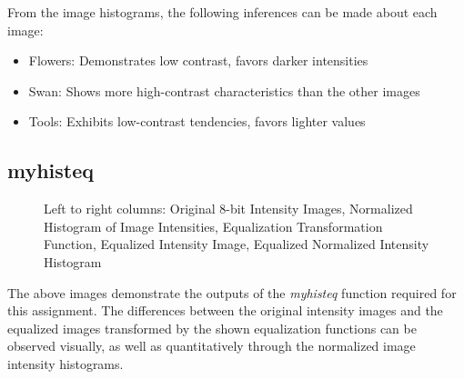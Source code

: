 \documentclass{article}[12 pt]
\begin{document}
From the image histograms, the following inferences can be made about each image: 
\begin{itemize}
\item Flowers: Demonstrates low contrast, favors darker intensities
\item Swan: Shows more high-contrast characteristics than the other images
\item Tools: Exhibits low-contrast tendencies, favors lighter values
\end{itemize}

\newpage
\subsection*{myhisteq}

\begin{figure}[h!]
\captionsetup[subfloat]{labelformat=empty}
\centering
{}
\hspace{0mm}
\hspace{0mm}
\caption{Left to right columns: Original 8-bit Intensity Images,  Normalized Histogram of Image Intensities, Equalization Transformation Function, Equalized Intensity Image, Equalized Normalized Intensity Histogram}
\end{figure}

The above images demonstrate the outputs of the \emph{myhisteq} function required for this assignment.  The differences between the original intensity images and the equalized images transformed by the shown equalization functions can be observed visually, as well as quantitatively through the normalized image intensity histograms.
\end{document}
